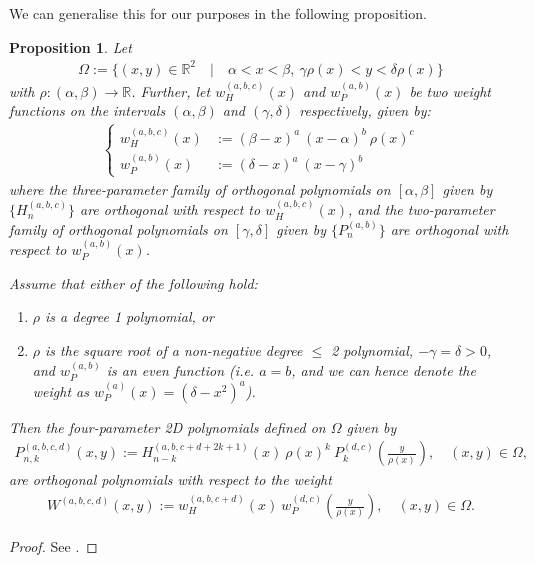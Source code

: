 \documentclass[11pt, oneside]{article}   	%
\newcommand{\R}{\mathbb{R}}
\newcommand{\Pnk}{P_{n,k}}
\newtheorem{proposition}{Proposition}
\begin{document}
We can generalise this for our purposes in the following proposition.
\begin{proposition}
Let
\begin{align*}
	\Omega := \{(x,y) \in \R^2 \quad | \quad \alpha < x < \beta, \: \gamma \rho(x) < y < \delta \rho(x)\}
\end{align*}
with $\rho : (\alpha, \beta) \to \R$. Further, let $w^{(a,b,c)}_H(x)$ and $w^{(a,b)}_P(x)$ be two weight functions on the intervals $(\alpha, \beta)$ and $(\gamma, \delta)$ respectively, given by:
\begin{align}
\begin{cases}
w^{(a,b,c)}_H(x) &:= (\beta - x)^a \: (x - \alpha)^{b} \: \rho(x)^{c} \\
w^{(a,b)}_P(x) &:= (\delta-x)^a \: (x - \gamma)^b
\end{cases}
\end{align}
where the three-parameter family of orthogonal polynomials on $[\alpha,\beta]$ given by $\{H_n^{(a,b,c)}\}$ are orthogonal with respect to $w^{(a,b,c)}_H(x)$, and the two-parameter family of orthogonal polynomials on $[\gamma,\delta]$ given by $\{P_n^{(a,b)}\}$ are orthogonal with respect to $w^{(a,b)}_P(x)$.

Assume that either of the following hold:
\begin{enumerate}
\item  \(\rho\) is a degree 1 polynomial, or 
\item \(\rho\) is the square root of a non-negative degree \(\le\) 2 polynomial, \(-\gamma = \delta > 0\), and \(w^{(a,b)}_P\) is an even function (i.e. $a = b$, and we can hence denote the weight as $w^{(a)}_P(x) = (\delta-x^2)^a$).
\end{enumerate}
Then the four-parameter 2D polynomials defined on $\Omega$ given by
\begin{align}
	\Pnk^{(a,b,c,d)}(x,y) := H_{n-k}^{(a, b, c+d+2k+1)}(x) \: \rho(x)^k \: P_k^{(d,c)}(\frac{y}{\rho(x)}), \quad (x,y) \in \Omega, 
\end{align}
are orthogonal polynomials with respect to the weight 
\begin{align}
	W^{(a,b,c,d)}(x,y) := w^{(a,b,c+d)}_H(x) \: w_P^{(d,c)}(\frac{y}{\rho(x)}), \quad (x,y) \in \Omega. 
\end{align}
\end{proposition}
\begin{proof}
See \cite[p55--56]{dunkl2014orthogonal}.
\end{proof}
\end{document}

